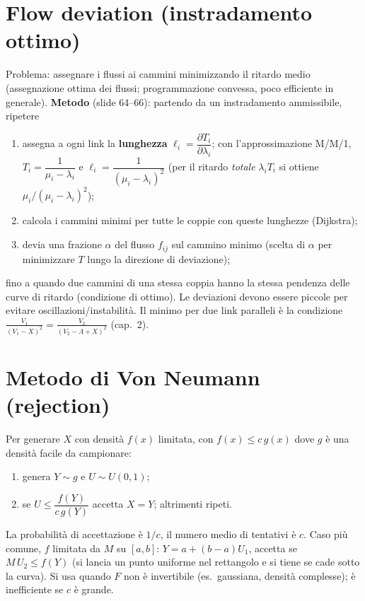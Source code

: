 \section{Flow deviation (instradamento ottimo)}
Problema: assegnare i flussi ai cammini minimizzando il ritardo medio (assegnazione ottima dei flussi; programmazione convessa, poco efficiente in generale).
\textbf{Metodo} (slide 64--66): partendo da un instradamento ammissibile, ripetere
\begin{enumerate}[nosep]
\item assegna a ogni link la \textbf{lunghezza} $\ell_i=\dfrac{\partial T_i}{\partial\lambda_i}$; con l'approssimazione M/M/1, $T_i=\dfrac1{\mu_i-\lambda_i}$ e $\ell_i=\dfrac1{(\mu_i-\lambda_i)^2}$ (per il ritardo \emph{totale} $\lambda_iT_i$ si ottiene $\mu_i/(\mu_i-\lambda_i)^2$\mio);
\item calcola i cammini minimi per tutte le coppie con queste lunghezze (Dijkstra);
\item devia una frazione $\alpha$ del flusso $f_{ij}$ sul cammino minimo (scelta di $\alpha$ per minimizzare $T$ lungo la direzione di deviazione);
\end{enumerate}
fino a quando due cammini di una stessa coppia hanno la stessa pendenza delle curve di ritardo (condizione di ottimo). Le deviazioni devono essere piccole per evitare oscillazioni/instabilità. Il minimo per due link paralleli è la condizione $\tfrac{V_1}{(V_1-X)^2}=\tfrac{V_2}{(V_2-\Lambda+X)^2}$ (cap.~2).

\section{Metodo di Von Neumann (rejection)}\mio
Per generare $X$ con densità $f(x)$ limitata, con $f(x)\le c\,g(x)$ dove $g$ è una densità facile da campionare:
\begin{enumerate}[nosep]
\item genera $Y\sim g$ e $U\sim U(0,1)$;
\item se $U\le\dfrac{f(Y)}{c\,g(Y)}$ accetta $X=Y$; altrimenti ripeti.
\end{enumerate}
La probabilità di accettazione è $1/c$, il numero medio di tentativi è $c$. Caso più comune, $f$ limitata da $M$ su $[a,b]$: $Y=a+(b-a)U_1$, accetta se $M\,U_2\le f(Y)$ (si lancia un punto uniforme nel rettangolo e si tiene se cade sotto la curva). Si usa quando $F$ non è invertibile (es.\ gaussiana, densità complesse); è inefficiente se $c$ è grande.

